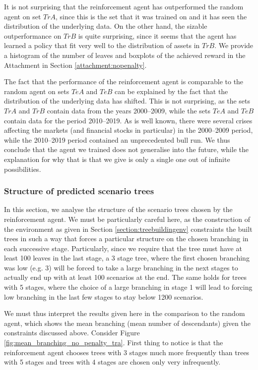 It is not surprising that the reinforcement agent has outperformed the random agent on set $TrA$, since this is the set that it was trained on and it has seen the distribution of the underlying data. On the other hand, the sizable outperformance on $TrB$ is quite surprising, since it seems that the agent has learned a policy that fit very well to the distribution of assets in $TrB$. We provide a histogram of the number of leaves and boxplots of the achieved reward in the Attachment in Section \ref{attachment:nopenalty}. 

The fact that the performance of the reinforcement agent is comparable to the random agent on sets $TeA$ and $TeB$ can be explained by the fact that the distribution of the underlying data has shifted. This is not surprising, as the sets $TrA$ and $TrB$ contain data from the years 2000--2009, while the sets $TeA$ and $TeB$ contain data for the period 2010--2019. As is well known, there were several crises affecting the markets (and financial stocks in particular) in the 2000--2009 period, while the 2010--2019 period contained an unprecedented bull run. We thus conclude that the agent we trained does not generalise into the future, while the explanation for why that is that we give is only a single one out of infinite possibilities. 

\subsubsection{Structure of predicted scenario trees}
In this section, we analyse the structure of the scenario trees chosen by the reinforcement agent. We must be particularly careful here, as the construction of the environment as given in Section \ref{section:treebuildingenv} constraints the built trees in such a way that forces a particular structure on the chosen branching in each successive stage. Particularly, since we require that the tree must have at least 100 leaves in the last stage, a 3 stage tree, where the first chosen branching was low (e.g. 3) will be forced to take a large branching in the next stages to actually end up with at least 100 scenarios at the end. The same holds for trees with 5 stages, where the choice of a large branching in stage 1 will lead to forcing low branching in the last few stages to stay below 1200 scenarios. 


We must thus interpret the results given here in the comparison to the random agent, which shows the mean branching (mean number of descendants) given the constraints discussed above. Consider Figure \ref{fig:mean_branching_no_penalty_tra}. First thing to notice is that the reinforcement agent chooses trees with 3 stages much more frequently than trees with 5 stages and trees with 4 stages are chosen only very infrequently. 


